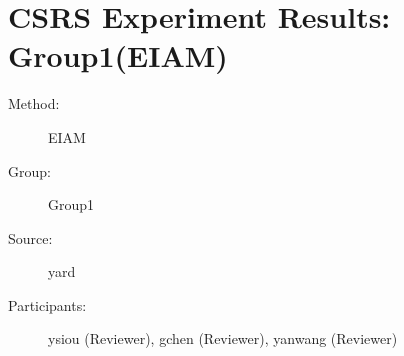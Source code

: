 \chapter {CSRS Experiment Results: Group1(EIAM)}
\small

\begin{description}
\item [Method:] EIAM
\item [Group:] Group1
\item [Source:] yard
\item [Participants:] ysiou (Reviewer), gchen (Reviewer), yanwang (Reviewer)
\end{description}
